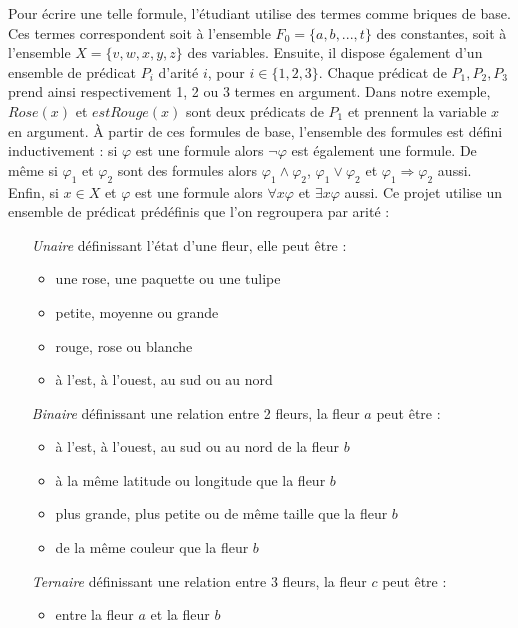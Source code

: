 Pour écrire une telle formule, l'étudiant utilise des termes comme
briques de base. Ces termes correspondent soit à l'ensemble $F_0=\{a,
b, ..., t\}$ des constantes, soit à l'ensemble $X=\{v, w, x, y, z\}$
des variables.  \newline Ensuite, il dispose également d'un ensemble
de prédicat $P_i$ d'arité $i$, pour $i\in \{1,2,3\}$. Chaque prédicat
de $P_1, P_2, P_3$ prend ainsi respectivement 1, 2 ou 3 termes en
argument. Dans notre exemple, $Rose(x)$ et $estRouge(x)$ sont deux
prédicats de $P_1$ et prennent la variable $x$ en argument.  \newline
\`A partir de ces formules de base, l'ensemble des formules est défini
inductivement : si $\varphi$ est une formule alors $\lnot \varphi$ est
également une formule. De même si $\varphi_1$ et $\varphi_2$ sont des
formules alors $\varphi_1 \land \varphi_2$, $\varphi_1 \lor \varphi_2$
et $\varphi_1 \Rightarrow \varphi_2$ aussi.  Enfin, si $x \in X$ et
$\varphi$ est une formule alors $\forall x \varphi$ et $\exists x
\varphi$ aussi.  \newline Ce projet utilise un ensemble de prédicat
prédéfinis que l'on regroupera par arité :
\begin{itemize}
	\item[\textit{Unaire}] définissant l'état d'une fleur, elle peut être :
		\begin{itemize}
			\item une rose, une paquette ou une tulipe
			\item petite, moyenne ou grande
			\item rouge, rose ou blanche
			\item à l'est, à l'ouest, au sud ou au nord
		\end{itemize}
              \item[\textit{Binaire}] définissant une relation entre 2
                fleurs, la fleur $a$ peut être :
		\begin{itemize}
                \item à l'est, à l'ouest, au sud ou au nord de la
                  fleur $b$
			\item à la même latitude ou longitude que la fleur $b$
			\item plus grande, plus petite ou de même
                          taille que la fleur $b$
			\item de la même couleur que la fleur $b$
		\end{itemize}
              \item[\textit{Ternaire}] définissant une relation entre
                3 fleurs, la fleur $c$ peut être :
		\begin{itemize}
                \item entre la fleur $a$ et la fleur $b$
		\end{itemize}
\end{itemize}

